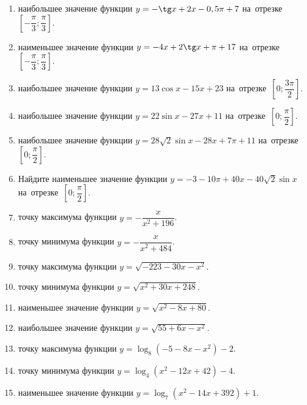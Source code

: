 \documentclass[a4paper,10pt]{article}
\begin{document}
\begin{enumerate}
\item {} наибольшее значение функции $y=-\tg x +2x-0,5\pi +7$ на~отрезке~$\left[-\dfrac{\pi}{3};\dfrac{\pi}{3}\right]$.

\item {} наименьшее значение функции $y=-4x +2\tg x+\pi+17$ на~отрезке~$\left[-\dfrac{\pi}{3};\dfrac{\pi}{3}\right]$.

\item {} наибольшее значение функции $y=13\cos x-15x+23$ на~отрезке~$\left[0;\dfrac{3\pi}{2}\right]$.

\item {} наибольшее значение функции $y=22\sin x-27x+11$ на~отрезке~$\left[0;\dfrac{\pi}{2}\right]$.

\item {} наибольшее значение функции $y=28\sqrt{2}\sin x-28x+7\pi +11$ на~отрезке~$\left[0;\dfrac{\pi}{2}\right]$.

\item Найдите наименьшее значение функции $y=-3-10\pi+40x-40\sqrt{2}\sin x$ на~отрезке~$\left[0;\dfrac{\pi}{2}\right]$.

\item {} точку максимума функции $y=-\dfrac{x}{ x^2 +196}$.

\item {} точку минимума функции $y=-\dfrac{x}{ x^2 +484}$.

\item {} точку максимума функции $y=\sqrt{-223-30x-x^2}$.

\item {} точку минимума функции $y=\sqrt{x^2+30x+248}$.

\item {} наименьшее значение функции $y=\sqrt{x^2-8x+80}$.

\item {} наибольшее значение функции $y=\sqrt{55+6x-x^2}$.

\item {} точку максимума функции $y=\log_8\left(-5-8x-x^2\right)-2$.

\item {} точку минимума функции $y=\log_4\left(x^2-12x+42\right)-4$.

\item {} наименьшее значение функции $y=\log_7\left(x^2-14x+392\right)+1$.


\end{enumerate}
\end{document}
